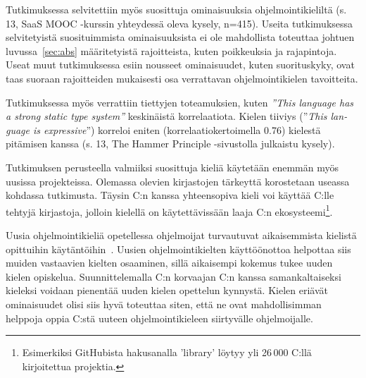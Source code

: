 Tutkimuksessa selvitettiin myös suosittuja ominaisuuksia ohjelmointikieliltä
(s. 13, SaaS MOOC -kurssin yhteydessä oleva kysely, n=415). Useita
tutkimuksessa selvitetyistä suosituimmista ominaisuuksista ei ole mahdollista
toteuttaa johtuen luvussa~\ref{sec:abs} määritetyistä rajoitteista, kuten
poikkeuksia ja rajapintoja. Useat muut tutkimuksessa esiin nousseet
ominaisuudet, kuten suorituskyky, ovat taas suoraan rajoitteiden mukaisesti osa
verrattavan ohjelmointikielen tavoitteita.

Tutkimuksessa myös verrattiin tiettyjen toteamuksien, kuten
\emph{''\foreignlanguage{english}{This language has a strong static type
system}''} keskinäistä korrelaatiota. Kielen tiiviys
(''\emph{\foreignlanguage{english}{This language is expressive}}'') korreloi
eniten (korrelaatiokertoimella 0.76) kielestä pitämisen kanssa (s. 13, The
Hammer Principle -sivustolla julkaistu kysely).


Tutkimuksen perusteella valmiiksi suosittuja kieliä käytetään enemmän myös
uusissa projekteissa. Olemassa olevien kirjastojen tärkeyttä korostetaan
useassa kohdassa tutkimusta. Täysin C:n kanssa yhteensopiva kieli voi käyttää
C:lle tehtyjä kirjastoja, jolloin kielellä on käytettävissään laaja C:n
ekosysteemi\footnote{Esimerkiksi GitHubista hakusanalla 'library' löytyy yli
26\,000 C:llä kirjoitettua projektia.}.

Uusia ohjelmointikieliä opetellessa ohjelmoijat turvautuvat aikaisemmista
kielistä opittuihin käytäntöihin~\citep{languagelearning}. Uusien
ohjelmointikielten käyttöönottoa helpottaa siis muiden vastaavien kielten
osaaminen, sillä aikaisempi kokemus tukee uuden kielen opiskelua.
Suunnittelemalla C:n korvaajan C:n kanssa samankaltaiseksi kieleksi voidaan
pienentää uuden kielen opettelun kynnystä. Kielen eriävät ominaisuudet olisi
siis hyvä toteuttaa siten, että ne ovat mahdollisimman helppoja oppia C:stä
uuteen ohjelmointikieleen siirtyvälle ohjelmoijalle.


